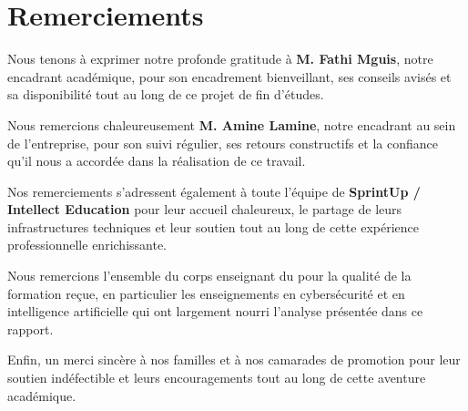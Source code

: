 \chapter*{Remerciements}
\thispagestyle{plain}

Nous tenons à exprimer notre profonde gratitude à \textbf{M. Fathi Mguis},
notre encadrant académique, pour son encadrement bienveillant, ses conseils
avisés et sa disponibilité tout au long de ce projet de fin d'études.

Nous remercions chaleureusement \textbf{M. Amine Lamine}, notre encadrant
au sein de l'entreprise, pour son suivi régulier, ses retours constructifs
et la confiance qu'il nous a accordée dans la réalisation de ce travail.

Nos remerciements s'adressent également à toute l'équipe de
\textbf{SprintUp / Intellect Education} pour leur accueil chaleureux,
le partage de leurs infrastructures techniques et leur soutien tout au
long de cette expérience professionnelle enrichissante.

Nous remercions l'ensemble du corps enseignant du \textbf{\master}
pour la qualité de la formation reçue, en particulier les enseignements
en cybersécurité et en intelligence artificielle qui ont largement
nourri l'analyse présentée dans ce rapport.

Enfin, un merci sincère à nos familles et à nos camarades de promotion
pour leur soutien indéfectible et leurs encouragements tout au long
de cette aventure académique.

\newpage
